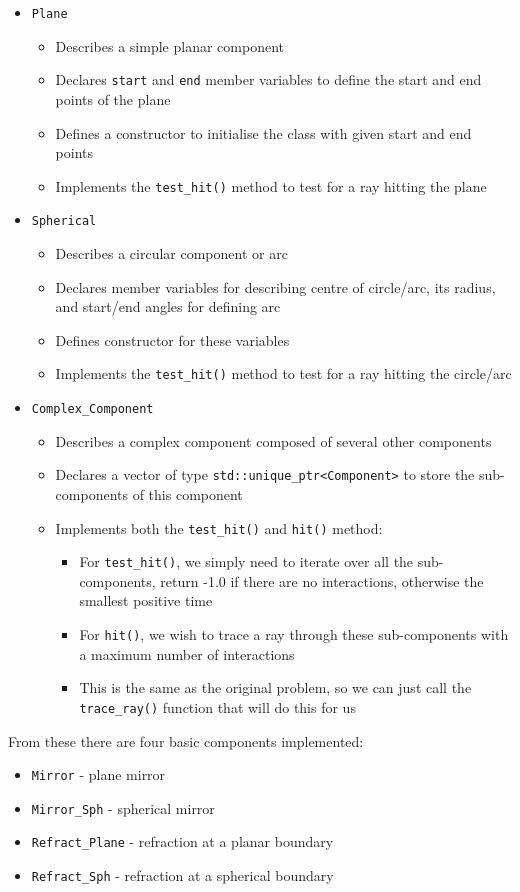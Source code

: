 \documentclass{article}
\begin{document}
\begin{itemize}
    \item \texttt{Plane}
    \begin{itemize}
        \item Describes a simple planar component
        \item Declares \texttt{start} and \texttt{end} member variables to define the start and end points of the plane
        \item Defines a constructor to initialise the class with given start and end points
        \item Implements the \texttt{test\_hit()} method to test for a ray hitting the plane
    \end{itemize}
    \item \texttt{Spherical}
    \begin{itemize}
        \item Describes a circular component or arc
        \item Declares member variables for describing centre of circle/arc, its radius, and start/end angles for defining arc
        \item Defines constructor for these variables
        \item Implements the \texttt{test\_hit()} method to test for a ray hitting the circle/arc
    \end{itemize}
    \item \texttt{Complex\_Component}
    \begin{itemize}
        \item Describes a complex component composed of several other components
        \item Declares a vector of type \texttt{std::unique\_ptr<Component>} to store the sub-components of this component
        \item Implements both the \texttt{test\_hit()} and \texttt{hit()} method:
        \begin{itemize}
            \item For \texttt{test\_hit()}, we simply need to iterate over all the sub-components, return -1.0 if there are no interactions, otherwise the smallest positive time
            \item For \texttt{hit()}, we wish to trace a ray through these sub-components with a maximum number of interactions
            \item This is the same as the original problem, so we can just call the \texttt{trace\_ray()} function that will do this for us
        \end{itemize}
    \end{itemize}
\end{itemize}
From these there are four basic components implemented:
\begin{itemize}
    \item \texttt{Mirror} - plane mirror
    \item \texttt{Mirror\_Sph} - spherical mirror
    \item \texttt{Refract\_Plane} - refraction at a planar boundary
    \item \texttt{Refract\_Sph} - refraction at a spherical boundary
\end{itemize}
\end{document}
